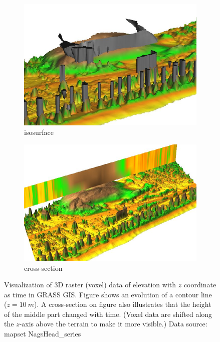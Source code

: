 \documentclass[a4paper,12pt,oneside]{book}
\begin{document}
\begin{figure}[ht!]
\centering
    \begin{subfigure}[ht]{0.49\textwidth}
    \centering
        \includegraphics[width=\textwidth]{./images/nviz_isosurface.jpg}
    \caption{isosurface}
    \label{fig:nviz_isosurface}
    \end{subfigure}
    \begin{subfigure}[ht]{0.49\textwidth}
    \centering
        \includegraphics[width=\textwidth]{./images/nviz_slices.jpg}
    \caption{cross-section}
    \label{fig:nviz_slices}
    \end{subfigure}
\caption[Visualization of 3D raster (voxel) data of elevation with $z$ coordinate as time in GRASS GIS]
{Visualization of 3D raster (voxel) data of elevation with $z$ coordinate as time in GRASS GIS.
Figure  shows an evolution of a contour line ($z=10\ m$).
A cross-section on figure  also illustrates that the height of the middle
part changed with time. (Voxel data are shifted along the $z$-axis above the terrain to make it more visible.)
Data source: mapset NagsHead\_series~\cite{nagshead}}

\label{fig:nviz_voxel}
\end{figure}
\end{document}
